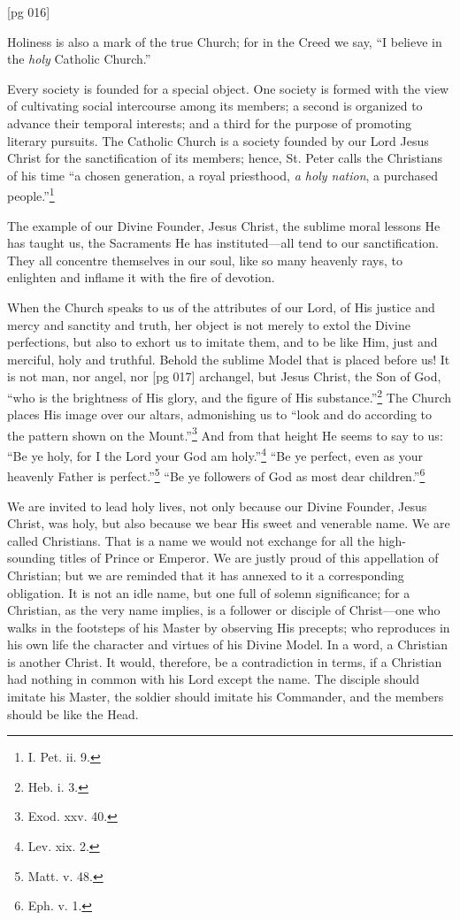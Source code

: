 [pg 016]


Holiness is also a mark of the true Church;
for in the Creed we say, “I believe in the
\emph{holy} Catholic Church.”

Every society is founded for a special object.
One society is formed with the view of cultivating
social intercourse among its members; a second is
organized to advance their temporal interests; and
a third for the purpose of promoting literary pursuits.
The Catholic Church is a society founded
by our Lord Jesus Christ for the sanctification of
its members; hence, St. Peter calls the Christians
of his time “a chosen generation, a royal priesthood,
\emph{a holy nation}, a purchased people.”\footnote{I.
Pet. ii. 9.}

The example of our Divine Founder, Jesus
Christ, the sublime moral lessons He has taught
us, the Sacraments He has instituted—all tend to
our sanctification. They all concentre themselves
in our soul, like so many heavenly rays, to enlighten
and inflame it with the fire of devotion.

When the Church speaks to us of the attributes
of our Lord, of His justice and mercy and sanctity
and truth, her object is not merely to extol the
Divine perfections, but also to exhort us to imitate
them, and to be like Him, just and merciful, holy
and truthful. Behold the sublime Model that is
placed before us! It is not man, nor angel, nor
[pg 017]
archangel, but Jesus Christ, the Son of God, “who
is the brightness of His glory, and the figure of
His substance.”\footnote{Heb. i.
3.} The Church places His image
over our altars, admonishing us to “look and do
according to the pattern shown on the Mount.”\footnote{Exod.
xxv. 40.} And from that height He seems to say to us: “Be
ye holy, for I the Lord your God am holy.”\footnote{Lev.
xix. 2.} “Be ye perfect, even as your heavenly Father is
perfect.”\footnote{Matt. v. 48.}
“Be ye followers of God as most dear
children.”\footnote{Eph. v. 1.}

We are invited to lead holy lives, not only because
our Divine Founder, Jesus Christ, was holy,
but also because we bear His sweet and venerable
name. We are called Christians. That is a name
we would not exchange for all the high-sounding
titles of Prince or Emperor. We are justly proud
of this appellation of Christian; but we are reminded
that it has annexed to it a corresponding
obligation. It is not an idle name, but one full of
solemn significance; for a Christian, as the very
name implies, is a follower or disciple of Christ—one
who walks in the footsteps of his Master by
observing His precepts; who reproduces in his
own life the character and virtues of his Divine
Model. In a word, a Christian is another Christ.
It would, therefore, be a contradiction in terms, if
a Christian had nothing in common with his Lord
except the name. The disciple should imitate his
Master, the soldier should imitate his Commander,
and the members should be like the Head.


